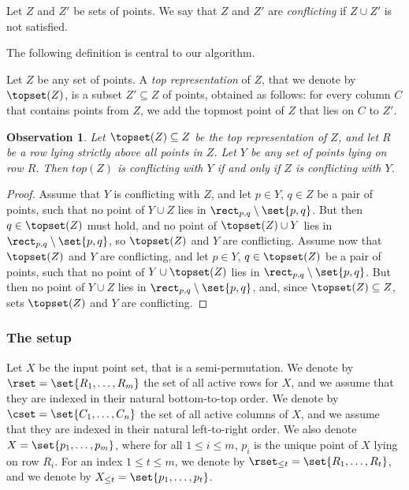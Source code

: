 \documentclass{toc}
\newtheorem{myobs}[theorem]{Observation}
\begin{document}
\begin{definition}  
Let $Z$ and $Z'$ be sets of points. 
We say that $Z$ and $Z'$ are \emph{conflicting} if $Z \cup Z'$ is not satisfied. 
%
\end{definition} 



%
%

%
%
%
%
%


The following definition is central to our algorithm.

\begin{definition}  
Let $Z$ be any set of points.
A \emph{top representation} of $Z$, that we denote by $\topset(Z)$, is a subset $Z' \subseteq Z$ of points, obtained as follows: for every column $C$ that contains points from $Z$, we add the topmost point of $Z$ that lies on $C$ to $Z'$.
\end{definition} 

\begin{myobs} 
\label{obs:top points sufficient} 
Let $\topset(Z) \subseteq Z$ be the top representation of $Z$, and let $R$ be a row lying strictly above all points in $Z$. Let $Y$ be any set of points lying on row $R$. Then $top(Z)$ is conflicting with $Y$ if and only if $Z$ is conflicting with $Y$.  
\end{myobs} 
\begin{proof}
	Assume that $Y$ is conflicting with $Z$, and let $p\in Y$, $q\in Z$ be a pair of points, such that no point of $Y\cup Z$ lies in $\rect_{p,q}\setminus\set{p,q}$. But then $q\in \topset(Z)$ must hold, and no point of $\topset(Z)\cup Y$ lies in $\rect_{p,q}\setminus\set{p,q}$, so $\topset(Z)$ and $Y$ are conflicting.
	Assume now that $\topset(Z)$ and $Y$ are conflicting, and let $p\in Y$, $q\in \topset(Z)$ be a pair of points, such that no point of $Y\cup \topset(Z)$ lies in $\rect_{p,q}\setminus\set{p,q}$. But then no point of $Y\cup Z$ lies in $\rect_{p,q}\setminus\set{p,q}$, and, since $\topset(Z)\subseteq Z$, sets $\topset(Z)$ and $Y$ are conflicting.
\end{proof}




%



\subsubsection{The setup} 

Let $X$ be the input point set, that is a semi-permutation.
We denote by $\rset=\set{R_1,\ldots,R_m}$ the set of all active rows for $X$, and we assume that they are indexed in their natural bottom-to-top order. We denote by $\cset=\set{C_1,\ldots,C_n}$ the set of all active columns of $X$, and we assume that they are indexed in their natural left-to-right order. We also denote $X=\set{p_1,\ldots,p_m}$, where for all $1\leq i\leq m$, $p_i$ is the unique point of $X$ lying on row $R_i$.
For an index $1\leq t\leq m$, we denote by $\rset_{\leq t}=\set{R_1,\ldots,R_t}$, and we denote by $X_{\leq t}=\set{p_1,\ldots,p_t}$.
\end{document}

